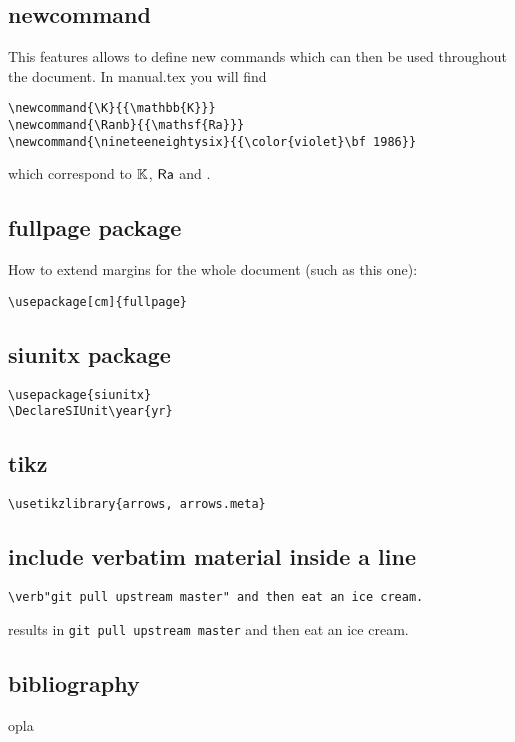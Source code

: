 

\subsection*{newcommand}

This features allows to define new commands which can then be used throughout the document. 
In {\filenamefont manual.tex} you will find

\begin{verbatim}
\newcommand{\K}{{\mathbb{K}}}
\newcommand{\Ranb}{{\mathsf{Ra}}}
\newcommand{\nineteeneightysix}{{\color{violet}\bf 1986}}
\end{verbatim}

which correspond to $\K$, $\Ranb$ and \nineteeneightysix.


\subsection*{fullpage package}

How to extend margins for the whole document (such as this one):
\begin{verbatim}
\usepackage[cm]{fullpage}
\end{verbatim}


\subsection*{siunitx package}

\begin{verbatim}
\usepackage{siunitx} 
\DeclareSIUnit\year{yr}
\end{verbatim}


\subsection*{tikz}


\begin{verbatim}
\usetikzlibrary{arrows, arrows.meta}
\end{verbatim}


\subsection*{include verbatim material inside a line}

\begin{verbatim}
\verb"git pull upstream master" and then eat an ice cream.
\end{verbatim}
results in
\verb"git pull upstream master" and then eat an ice cream.

\subsection*{bibliography}

opla
